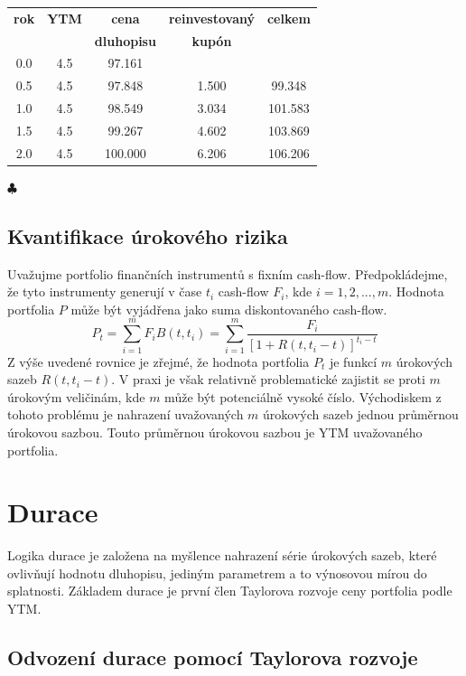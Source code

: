 \documentclass[a4paper]{book}
\begin{document}
\begin{center}
\begin{tabular}{c c c c c}
\textbf{rok} & \textbf{YTM} & \textbf{cena}      & \textbf{reinvestovaný} & \textbf{celkem} \\
             &              & \textbf{dluhopisu} & \textbf{kupón}         &  \\
\hline
0.0 & 4.5 &  97.161 &       & \\
0.5 & 4.5 &  97.848 & 1.500 &  99.348 \\
1.0 & 4.5 &  98.549 & 3.034 & 101.583 \\
1.5 & 4.5 &  99.267 & 4.602 & 103.869 \\
2.0 & 4.5 & 100.000 & 6.206 & 106.206
\end{tabular}
\end{center}
$\clubsuit$

\subsection{Kvantifikace úrokového rizika}

Uvažujme portfolio finančních instrumentů s fixním cash-flow. Předpokládejme, že tyto instrumenty generují v čase $t_i$ cash-flow $F_i$, kde $i = 1, 2, ..., m$. Hodnota portfolia $P$ může být vyjádřena jako suma diskontovaného cash-flow.
\begin{equation*}
P_t = \sum_{i = 1}^m F_i B(t,t_i) = \sum_{i = 1}^m \frac{F_i}{[1 + R(t, t_i - t)]^{t_i - t}}
\end{equation*}
Z výše uvedené rovnice je zřejmé, že hodnota portfolia $P_t$ je funkcí $m$ úrokových sazeb $R(t, t_i - t)$. V praxi je však relativně problematické zajistit se proti $m$ úrokovým veličinám, kde $m$ může být potenciálně vysoké číslo. Východiskem z tohoto problému je nahrazení uvažovaných $m$ úrokových sazeb jednou průměrnou úrokovou sazbou. Touto průměrnou úrokovou sazbou je YTM uvažovaného portfolia.

\section{Durace}

Logika durace je založena na myšlence nahrazení série úrokových sazeb, které ovlivňují hodnotu dluhopisu, jediným parametrem a to výnosovou mírou do splatnosti. Základem durace je první člen Taylorova rozvoje ceny portfolia podle YTM.

\subsection{Odvození durace pomocí Taylorova rozvoje}
\end{document}
